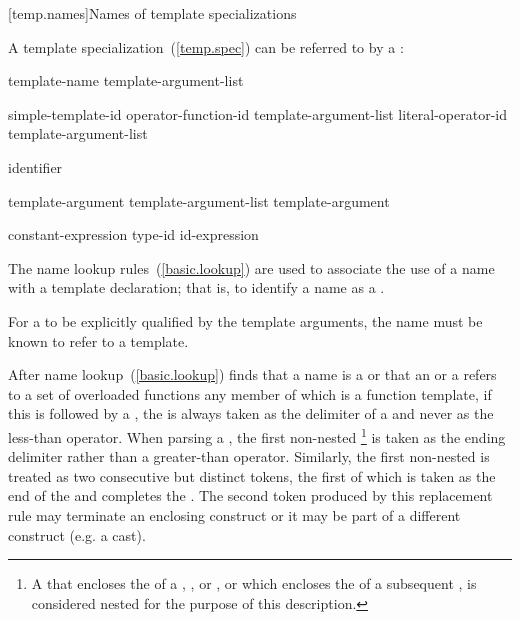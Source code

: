 [temp.names]{Names of template specializations}

\pnum
A template specialization~(\ref{temp.spec}) can be referred to by a
:

\begin{bnf}
\br
  template-name \terminal{<} template-argument-list\opt{} \terminal{>}
\end{bnf}

\begin{bnf}
\br
  simple-template-id\br
  operator-function-id \terminal{<} template-argument-list\opt{} \terminal{>}\br
  literal-operator-id \terminal{<} template-argument-list\opt{} \terminal{>}
\end{bnf}

\begin{bnf}
\br
  identifier
\end{bnf}

\begin{bnf}
\br
  template-argument \opt\br
  template-argument-list \terminal{,} template-argument \opt
\end{bnf}

\begin{bnf}
\br
  constant-expression\br
  type-id\br
  id-expression
\end{bnf}

\enternote
The name lookup rules~(\ref{basic.lookup}) are used to associate the use of
a name with a template declaration;
that is, to identify a name as a
.
\exitnote

\pnum
For a
to be explicitly qualified by the template arguments,
the name must be known to refer to a template.

\pnum
{}%
After name lookup~(\ref{basic.lookup}) finds that a name is a
or that an  or a  refers to a set of
overloaded functions any member of which is a function template,
if this is followed by a
\tcode{<},
the
\tcode{<}
is always taken as the delimiter of a
and never as the less-than operator.
When parsing a ,
the first non-nested
\tcode{>}\footnote{A \tcode{>} that encloses the 
of a , , 
or , or which encloses the 
of a subsequent , is considered nested for the purpose
of this description.
}
is taken as the ending delimiter
rather than a greater-than operator.
Similarly, the first non-nested \tcode{>{>}} is treated as two
consecutive but distinct \tcode{>} tokens, the first of which is taken
as the end of the  and completes
the . \enternote The second \tcode{>}
token produced by this replacement rule may terminate an enclosing
 construct or it may be part of a different
construct (e.g. a cast).\exitnote
\enterexample

